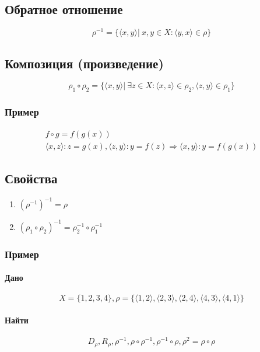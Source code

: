 \documentclass{article}
\begin{document}
\subsection{Обратное отношение}
\[
    \rho^{-1} = \{\langle x, y \rangle |~x, y \in X: \langle y, x \rangle \in \rho \}
\]


\subsection{Композиция (произведение)}
\[
    \rho_1 \circ \rho_2 = \{\langle x, y \rangle |~\exists z \in X: \langle x, z \rangle \in \rho_2, \langle z, y \rangle \in \rho_1\}
\]


\subsubsection{Пример}
\begin{gather*}
    f \circ g = f(g(x)) \\
    \langle x, z \rangle: z = g(x), \langle z, y \rangle: y = f(z) \Rightarrow \langle x, y \rangle: y = f(g(x))
\end{gather*}


\subsection{Свойства}
\begin{enumerate}
    \item $(\rho^{-1})^{-1} = \rho$
    \item $(\rho_1 \circ \rho_2)^{-1} = \rho^{-1}_2 \circ \rho^{-1}_1$
\end{enumerate}

\subsubsection{Пример}
\paragraph{Дано}
\[
    X = \{1, 2, 3, 4\}, \rho = \{\langle 1, 2 \rangle, \langle 2, 3 \rangle, \langle 2, 4 \rangle, \langle 4, 3 \rangle, \langle 4, 1 \rangle\}
\]

\paragraph{Найти}
\[
    D_{\rho}, R_{\rho}, \rho^{-1}, \rho \circ \rho^{-1}, \rho^{-1} \circ \rho, \rho^{2} = \rho \circ \rho
\]
\end{document}
